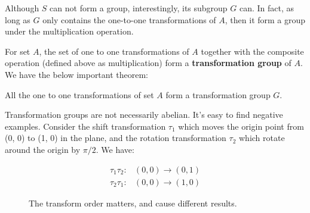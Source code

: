\documentclass[b5paper]{article}
\begin{document}
Although $S$ can not form a group, interestingly, its subgroup $G$ can. In fact, as long as $G$ only contains the one-to-one transformations of $A$, then it form a group under the multiplication operation.


For set $A$, the set of one to one transformations of $A$ together with the composite operation (defined above as multiplication) form a \textbf{transformation group} of $A$. We have the below important theorem:

\begin{theorem}
All the one to one transformations of set $A$ form a transformation group $G$.
\end{theorem}

Transformation groups are not necessarily abelian. It's easy to find negative examples. Consider the shift transformation $\tau_1$ which moves the origin point from (0, 0) to (1, 0) in the plane, and the rotation transformation $\tau_2$ which rotate around the origin by $\pi/2$. We have:

\[
\begin{array}{rl}
\tau_1\tau_2: & (0, 0) \to (0, 1) \\
\tau_2\tau_1: & (0, 0) \to (1, 0)
\end{array}
\]

\begin{figure}[htbp]
\centering
{}
\caption{The transform order matters, and cause different results.}
\label{fig:transform-not-abelian}
\end{figure}
\end{document}
